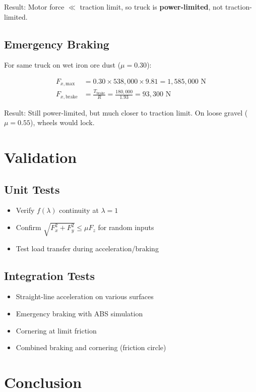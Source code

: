 \documentclass[11pt,a4paper]{article}
\begin{document}
Result: Motor force $\ll$ traction limit, so truck is \textbf{power-limited}, not traction-limited.

\subsection{Emergency Braking}

For same truck on wet iron ore dust ($\mu = 0.30$):

\begin{align}
F_{x,\text{max}} &= 0.30 \times 538{,}000 \times 9.81 = 1{,}585{,}000 \text{ N} \\
F_{x,\text{brake}} &= \frac{T_{\text{brake}}}{R} = \frac{180{,}000}{1.93} = 93{,}300 \text{ N}
\end{align}

Result: Still power-limited, but much closer to traction limit. On loose gravel ($\mu = 0.55$), wheels would lock.

\section{Validation}

\subsection{Unit Tests}
\begin{itemize}
    \item Verify $f(\lambda)$ continuity at $\lambda = 1$
    \item Confirm $\sqrt{F_x^2 + F_y^2} \leq \mu F_z$ for random inputs
    \item Test load transfer during acceleration/braking
\end{itemize}

\subsection{Integration Tests}
\begin{itemize}
    \item Straight-line acceleration on various surfaces
    \item Emergency braking with ABS simulation
    \item Cornering at limit friction
    \item Combined braking and cornering (friction circle)
\end{itemize}

\section{Conclusion}
\end{document}
